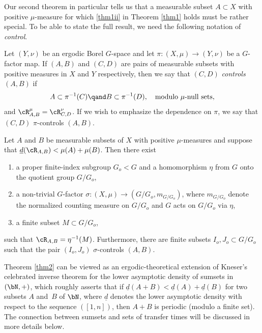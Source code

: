 Our second theorem in particular tells us that a measurable subset $A \subset X$ with positive $\mu$-measure for which \eqref{thm1ii} in Theorem \ref{thm1} holds must be rather special. To be able to state the full result, we need the following notation of \emph{control}.

\begin{definition}
Let $(Y,\nu)$ be an ergodic Borel $G$-space and let $\pi : (X,\mu) \to (Y,\nu)$ be a $G$-factor map. If $(A,B)$ and $(C,D)$ are pairs of measurable
subsets with positive measures in $X$ and $Y$ respectively, then we say that $(C,D)$ \emph{controls $(A,B)$} if
\[
A \subset \pi^{-1}(C) \qand B \subset \pi^{-1}(D), \quad \textrm{modulo $\mu$-null sets},
\]
and $\cR^\mu_{A,B} = \cR^\nu_{C,D}$. If we wish to emphasize the dependence on $\pi$, we say that $(C,D)$ $\pi$-controls $(A,B)$.
\end{definition}

\begin{theorem}									
\label{thm2}
Let $A$ and $B$ be measurable subsets of $X$ with positive $\mu$-measures and suppose that $\underline{d}(\cR_{A,B}) < \mu(A) + \mu(B)$. Then there exist

\begin{enumerate}
\item
a proper finite-index subgroup $G_o < G$ and a homomorphism $\eta$ from $G$ onto the quotient group $G/G_o$,
\item
a non-trivial $G$-factor $\sigma : (X,\mu) \to (G/G_o,m_{G/G_o})$, where $m_{G/G_o}$ denote the normalized
counting measure on $G/G_o$ and $G$ acts on $G/G_o$ via $\eta$,
\item
a finite subset $M \subset G/G_o$,
\end{enumerate}
such that $\cR_{A,B} = \eta^{-1}(M)$. Furthermore, there are finite subsets $I_o, J_o \subset G/G_o$ such that
the pair $(I_o,J_o)$ $\sigma$-controls $(A,B)$.
\end{theorem}

\begin{remark}
Theorem \ref{thm2} can be viewed as an ergodic-theoretical extension of Kneser's celebrated inverse theorem \cite{Kneser0} for the lower asymptotic density of sumsets in $(\bN,+)$, which roughly asserts that if $\underline{d}(A+B) < \underline{d}(A) + \underline{d}(B)$ for two subsets $A$ and~$B$
of $\bN$, where $\underline{d}$ denotes the lower asymptotic density with respect to the sequence $([1,n])$, then $A+B$ is periodic (modulo a finite set).
The connection between sumsets and sets of transfer times will be discussed in more details below.
\end{remark}

